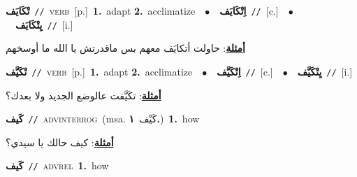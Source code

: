\documentclass[10pt,a4paper,twoside]{article} %
\begin{document}
\begin{multicols}{2}
{\setlength\topsep{0pt}\textbf{\foreignlanguage{arabic}{تْكَايَف}}\ {\color{gray}\texttt{//}\color{black}}\ \textsc{verb}\ [p.]\ \textbf{1.}~adapt  \textbf{2.}~acclimatize\ \ $\bullet$\ \ \setlength\topsep{0pt}\textbf{\foreignlanguage{arabic}{اِتْكَايَف}}\ {\color{gray}\texttt{//}\color{black}}\ [c.]\ \ $\bullet$\ \ \setlength\topsep{0pt}\textbf{\foreignlanguage{arabic}{يِتْكَايَف}}\ {\color{gray}\texttt{//}\color{black}}\ [i.]\  \begin{flushright}\color{gray}\foreignlanguage{arabic}{\textbf{\underline{\foreignlanguage{arabic}{أمثلة}}}: حاولت أتكايَف معهم بس ماقدرتش يا الله ما أوسخهم}\end{flushright}\color{black}} \vspace{2mm}

{\setlength\topsep{0pt}\textbf{\foreignlanguage{arabic}{تْكَيَّف}}\ {\color{gray}\texttt{//}\color{black}}\ \textsc{verb}\ [p.]\ \textbf{1.}~adapt  \textbf{2.}~acclimatize\ \ $\bullet$\ \ \setlength\topsep{0pt}\textbf{\foreignlanguage{arabic}{اِتْكَيَّف}}\ {\color{gray}\texttt{//}\color{black}}\ [c.]\ \ $\bullet$\ \ \setlength\topsep{0pt}\textbf{\foreignlanguage{arabic}{يِتْكَيَّف}}\ {\color{gray}\texttt{//}\color{black}}\ [i.]\  \begin{flushright}\color{gray}\foreignlanguage{arabic}{\textbf{\underline{\foreignlanguage{arabic}{أمثلة}}}: تكَيَّفت عالوضع الجديد ولا بعدك؟}\end{flushright}\color{black}} \vspace{2mm}

{\setlength\topsep{0pt}\textbf{\foreignlanguage{arabic}{كَيف}}\ {\color{gray}\texttt{//}\color{black}}\ \textsc{adv\textunderscore interrog}\ \color{gray}(msa. \foreignlanguage{arabic}{كَيْف}~\foreignlanguage{arabic}{\textbf{١.}})\color{black}\ \textbf{1.}~how\  \begin{flushright}\color{gray}\foreignlanguage{arabic}{\textbf{\underline{\foreignlanguage{arabic}{أمثلة}}}: كيف حالك يا سيدي؟}\end{flushright}\color{black}} \vspace{2mm}

{\setlength\topsep{0pt}\textbf{\foreignlanguage{arabic}{كَيف}}\ {\color{gray}\texttt{//}\color{black}}\ \textsc{adv\textunderscore rel}\ \textbf{1.}~how\ } \vspace{2mm}


\end{multicols}
\end{document}

